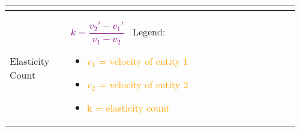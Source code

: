 \documentclass[main.tex,fontsize=8pt,paper=a4,paper=portrait,DIV=calc,]{scrartcl}
\begin{document}
\begin{table}[ht!]
\begin{tabular}{|m{0.2\linewidth}|m{0.755\linewidth}|}
\begin{itemize}
\end{itemize} 
\\
\hline
Elasticity Count & 
\vspace{2mm}
\Huge \textcolor{purple}{\( k = \dfrac{v_2' - v_1'}{v_1 - v_2} \)}\newline
\normalsize \, \newline
Legend:\newline
\begin{itemize}
\item \textcolor{orange}{\(v_1\) = velocity of entity 1}
\item \textcolor{orange}{\(v_2\) = velocity of entity 2}
\item \textcolor{orange}{k = elasticity count}
\vspace{-3mm}
\end{itemize} 
\\
\hline
\end{tabular}
\end{table}
\pagebreak 
\end{document}
